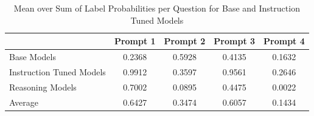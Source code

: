 
\begin{table}[h]
    \centering
    \begin{tabular}{lcccc}
        \toprule
        & Prompt 1 & Prompt 2 & Prompt 3 & Prompt 4 \\
        \midrule
        Base Models & 0.2368 & 0.5928 & 0.4135 & 0.1632 \\
        Instruction Tuned Models & 0.9912 & 0.3597 & 0.9561 & 0.2646 \\
        Reasoning Models & 0.7002 & 0.0895 & 0.4475 & 0.0022 \\
        Average & 0.6427 & 0.3474 & 0.6057 & 0.1434 \\
        \bottomrule
    \end{tabular}
    \caption{Mean over Sum of Label Probabilities per Question for Base and Instruction Tuned Models}
    \label{tab:labelprobsum}
\end{table}
